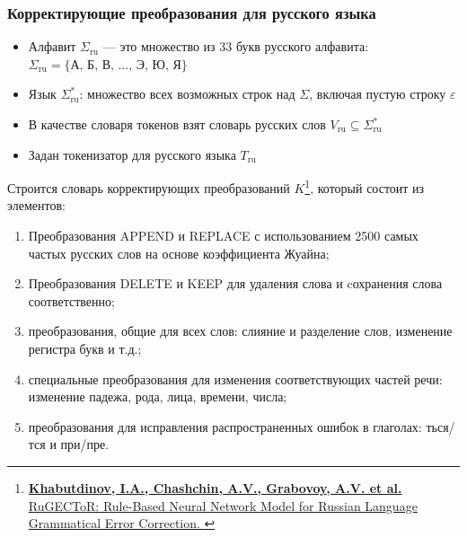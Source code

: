 \documentclass[10pt]{beamer}
\begin{document}
\begin{frame}
\frametitle{Корректирующие преобразования для русского языка}

\justifying
\begin{small}

\begin{itemize}
\item Алфавит \( {\Sigma}_{\text{ru}} \) — это множество из 33 букв русского алфавита: $\Sigma_{\text{ru}} = \{ \text{А, Б, В, ..., Э, Ю, Я} \}$
\item Язык \( \Sigma^*_{\text{ru}} \): множество всех возможных строк над \(\Sigma\), включая пустую строку \(\varepsilon\) 
\item В качестве словаря токенов взят словарь русских слов \( V_{\text{ru}} \subseteq \Sigma^*_{\text{ru}} \)
\item Задан токенизатор для русского языка $T_{\text{ru}}$
\end{itemize}


Строится словарь корректирующих преобразований $ K $\footnote{\href{https://link.springer.com/article/10.1134/S0361768824700129}{\textbf{Khabutdinov, I.A., Chashchin, A.V., Grabovoy, A.V. et al.} RuGECToR: Rule-Based Neural Network Model for Russian Language Grammatical Error Correction. }}, который состоит из элементов:
\begin{enumerate}
\item Преобразования APPEND и REPLACE с использованием 2500 самых частых русских слов на основе коэффициента Жуайна;
\item Преобразования DELETE и KEEP для удаления слова и cохранения слова соответственно;
\item преобразования, общие для всех слов: слияние и разделение слов, изменение регистра букв и т.д.;
\item специальные преобразования для изменения соответствующих частей речи: изменение падежа, рода, лица, времени, числа;
\item преобразования для исправления распространенных ошибок в глаголах: ться/тся и при/пре.
\end{enumerate}





\end{small}

\end{frame}
\end{document}
